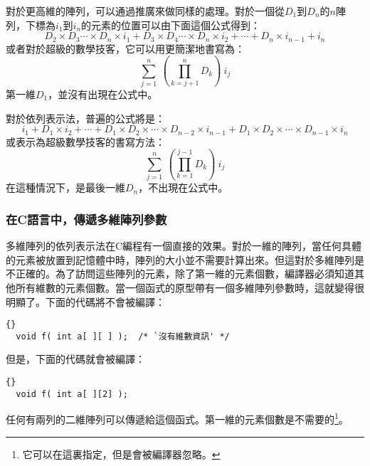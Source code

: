 對於更高維的陣列，可以通過推廣來做同樣的處理。對於一個從$D_1$到$D_n$的$n$陣列，下標為$i_1$到$i_n$的元素的位置可以由下面這個公式得到：
\begin{displaymath}
D_2 \times D_3 \cdots \times D_n \times i_1 + D_3 \times D_4 \cdots \times D_n
\times i_2 + \cdots + D_n \times i_{n-1} + i_n
\end{displaymath}
或者對於超級的數學技客，它可以用更簡潔地書寫為：
\begin{displaymath}
\sum_{j=1}^{n} \: \left( \prod_{k=j+1}^{n} D_k \right) \: i_j
\end{displaymath}
第一維$D_1$，並沒有出現在公式中。

對於依列表示法，普遍的公式將是：
\begin{displaymath}
i_1 + D_1 \times i_2 + \cdots + D_1 \times D_2 \times \cdots \times D_{n-2}
\times i_{n-1} + D_1 \times D_2 \times \cdots \times D_{n-1} \times i_n
\end{displaymath}
或表示為超級數學技客的書寫方法：
\begin{displaymath}
\sum_{j=1}^{n} \: \left( \prod_{k=1}^{j-1} D_k \right) \: i_j
\end{displaymath}
在這種情況下，是最後一維$D_n$，不出現在公式中。

\subsubsection{在C語言中，傳遞多維陣列參數}

多維陣列的依列表示法在C編程有一個直接的效果。對於一維的陣列，當任何具體的元素被放置到記憶體中時，陣列的大小並不需要計算出來。但這對於多維陣列是不正確的。為了訪問這些陣列的元素，除了第一維的元素個數，編譯器必須知道其他所有維數的元素個數。當一個函式的原型帶有一個多維陣列參數時，這就變得很明顯了。下面的代碼將不會被編譯：
\lstset{escapeinside=`',language=Pascal,%
}
\begin{lstlisting}[stepnumber=0]{}
  void f( int a[ ][ ] );  /* `沒有維數資訊' */
\end{lstlisting}
但是，下面的代碼就會被編譯：
\begin{lstlisting}[stepnumber=0]{}
  void f( int a[ ][2] );
\end{lstlisting}
任何有兩列的二維陣列可以傳遞給這個函式。第一維的元素個數是不需要的\footnote{它可以在這裏指定，但是會被編譯器忽略。}。

